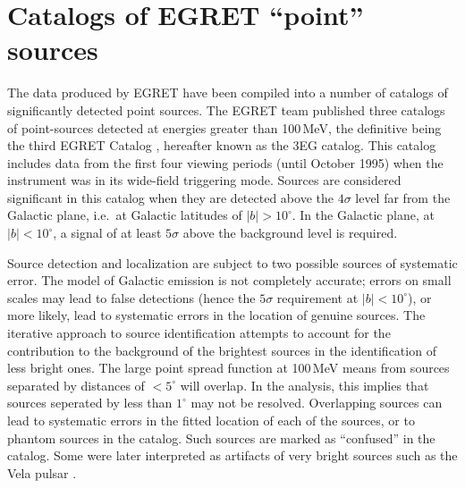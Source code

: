 \section{Catalogs of EGRET ``point'' sources}
\label{SEC::INTRODUCTION::EGRETCATALOG}

The data produced by EGRET have been compiled into a number of catalogs
of significantly detected point sources. The EGRET team published
three catalogs of point-sources detected at energies greater than
100\,MeV, the definitive being the third EGRET Catalog
\citep{REF::HARTMAN::APJS1999}, hereafter known as the 3EG catalog.
This catalog includes data from the first four viewing periods (until
October 1995) when the instrument was in its wide-field triggering
mode. Sources are considered significant in this catalog when they are
detected above the $4\sigma$ level far from the Galactic plane, i.e.\
at Galactic latitudes of $|b|>10^\circ$. In the Galactic plane, at
$|b|<10^\circ$, a signal of at least $5\sigma$ above the background
level is required.

Source detection and localization are subject to two possible sources
of systematic error.  The model of Galactic emission is not completely
accurate; errors on small scales may lead to false detections (hence
the $5\sigma$ requirement at $|b|<10^\circ$), or more likely, lead to
systematic errors in the location of genuine sources. The iterative
approach to source identification attempts to account for the
contribution to the background of the brightest sources in the
identification of less bright ones. The large point spread function at
100\,MeV means \Grays from sources separated by distances of
$<5^\circ$ will overlap. In the analysis, this implies that sources
seperated by less than $1^\circ$ may not be resolved. Overlapping
sources can lead to systematic errors in the fitted location of each
of the sources, or to phantom sources in the catalog. Such sources
are marked as ``confused'' in the catalog. Some were later interpreted
as artifacts of very bright sources such as the Vela pulsar
\citep{REF::THOMPSON::GAMMA2001}.

